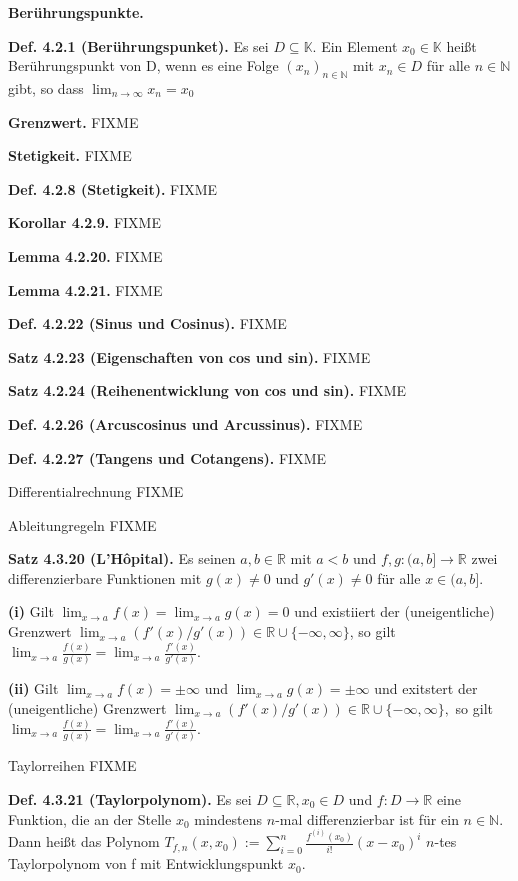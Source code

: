 \documentclass[ngerman]{article}
\begin{document}
\begin{multicols}{4}
\begin{tiny}
\textbf{Berührungspunkte.}

\textbf{Def. 4.2.1 (Berührungspunket).} Es sei $D \subseteq \mathbb K$. Ein Element $x_0 \in \mathbb K$ heißt Berührungspunkt von D, wenn es eine Folge $(x_n)_{n \in \mathbb N}$ mit $x_n \in D$ für alle $n \in \mathbb N$ gibt, so dass $\lim_{n \rightarrow \infty} x_n = x_0$

\textbf{Grenzwert.} FIXME

\textbf{Stetigkeit.} FIXME

\textbf{Def. 4.2.8 (Stetigkeit).} FIXME

\textbf{Korollar 4.2.9.} FIXME

\textbf{Lemma 4.2.20.} FIXME

\textbf{Lemma 4.2.21.} FIXME

\textbf{Def. 4.2.22 (Sinus und Cosinus).} FIXME

\textbf{Satz 4.2.23 (Eigenschaften von cos und sin).} FIXME

\textbf{Satz 4.2.24 (Reihenentwicklung von cos und sin).} FIXME

\textbf{Def. 4.2.26 (Arcuscosinus und Arcussinus).} FIXME

\textbf{Def. 4.2.27 (Tangens und Cotangens).} FIXME

Differentialrechnung FIXME



Ableitungregeln FIXME



\textbf{Satz 4.3.20 (L'Hôpital).} Es seinen $a,b\in\mathbb{R}$ mit
$a<b$ und $f,g:(a,b]\rightarrow\mathbb{R}$ zwei differenzierbare
Funktionen mit $g(x)\not=0$ und $g'(x)\not=0$ für alle $x\in(a,b]$.

\textbf{(i)} Gilt $\lim_{x\rightarrow a}f(x)=\lim_{x\rightarrow a}g(x)=0$
und existiiert der (uneigentliche) Grenzwert $\lim_{x\rightarrow a}(f'(x)/g'(x))\in\mathbb{R}\cup\{-\infty,\infty\}$,
so gilt $\lim_{x\rightarrow a}\frac{f(x)}{g(x)}=\lim_{x\rightarrow a}\frac{f'(x)}{g'(x)}$.

\textbf{(ii) }Gilt $\lim_{x\rightarrow a}f(x)=\pm\infty$ und $\lim_{x\rightarrow a}g(x)=\pm\infty$
und exitstert der (uneigentliche) Grenzwert $\lim_{x\rightarrow a}(f'(x)/g'(x))\in\mathbb{R}\cup\{-\infty,\infty\},$
so gilt $\lim_{x\rightarrow a}\frac{f(x)}{g(x)}=\lim_{x\rightarrow a}\frac{f'(x)}{g'(x)}$.

Taylorreihen FIXME

\textbf{Def. 4.3.21 (Taylorpolynom).} Es sei $D\subseteq\mathbb{R},x_{0}\in D$
und $f:D\rightarrow\mathbb{R}$ eine Funktion, die an der Stelle $x_{0}$
mindestens $n$-mal differenzierbar ist für ein $n\in\mathbb{N}.$
Dann heißt das Polynom $T_{f,n}(x,x_{0}):=\sum_{i=0}^{n}\frac{f^{(i)}(x_{0})}{i!}(x-x_{0})^{i}$
$n$-tes Taylorpolynom von f mit Entwicklungspunkt $x_{0}$.


\end{tiny}
\end{multicols}
\end{document}
